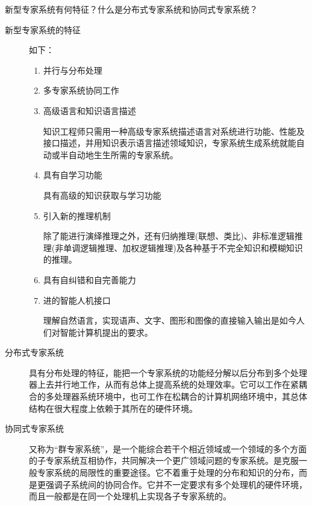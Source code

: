 \begin{question}
新型专家系统有何特征？什么是分布式专家系统和协同式专家系统？ 
\end{question}
\begin{solution}
	\begin{description}
		\item[新型专家系统的特征] 如下：
			\begin{enumerate}
				\item 并行与分布处理
				\item 多专家系统协同工作
				\item 高级语言和知识语言描述 \par
				知识工程师只需用一种高级专家系统描述语言对系统进行功能、性能及接口描述，并用知识表示语言描述领域知识，专家系统生成系统就能自动或半自动地生生所需的专家系统。
				\item 具有自学习功能 \par
				具有高级的知识获取与学习功能 
				\item 引入新的推理机制 \par
				除了能进行演绎推理之外，还有归纳推理(联想、类比)、非标准逻辑推理(非单调逻辑推理、加权逻辑推理)及各种基于不完全知识和模糊知识的推理。
				\item 具有自纠错和自完善能力 
				\item 进的智能人机接口 \par
				理解自然语言，实现语声、文字、图形和图像的直接输入输出是如今人们对智能计算机提出的要求。 
			\end{enumerate}
		\item[分布式专家系统]
		具有分布处理的特征，能把一个专家系统的功能经分解以后分布到多个处理器上去并行地工作，从而有总体上提高系统的处理效率。它可以工作在紧耦合的多处理器系统环境中，也可工作在松耦合的计算机网络环境中，其总体结构在很大程度上依赖于其所在的硬件环境。 
		\item[协同式专家系统]
		又称为“群专家系统”，是一个能综合若干个相近领域或一个领域的多个方面的子专家系统互相协作，共同解决一个更广领域问题的专家系统。是克服一般专家系统的局限性的重要途径。它不着重于处理的分布和知识的分布，而是更强调子系统间的协同合作。它并不一定要求有多个处理机的硬件环境，而且一般都是在同一个处理机上实现各子专家系统的。
	\end{description}
\end{solution}


